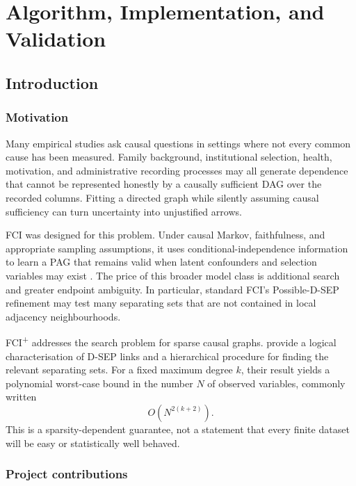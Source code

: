 \documentclass[11pt,a4paper,oneside]{report}
\newcommand{\FCIplus}{FCI\textsuperscript{+}}
\begin{document}
\clearpage
{}

\part{Algorithm, Implementation, and Validation}

\chapter{Introduction}

\section{Motivation}

Many empirical studies ask causal questions in settings where not every common
cause has been measured. Family background, institutional selection, health,
motivation, and administrative recording processes may all generate
dependence that cannot be represented honestly by a causally sufficient DAG
over the recorded columns. Fitting a directed graph while silently assuming
causal sufficiency can turn uncertainty into unjustified arrows.

FCI was designed for this problem. Under causal Markov, faithfulness, and
appropriate sampling assumptions, it uses conditional-independence
information to learn a PAG that remains valid when latent confounders and
selection variables may exist \citep{spirtes2000causation,
richardson2002ancestral}. The price of this broader model class is additional
search and greater endpoint ambiguity. In particular, standard FCI's
Possible-D-SEP refinement may test many separating sets that are not contained
in local adjacency neighbourhoods.

\FCIplus{} addresses the search problem for sparse causal graphs.
\citet{claassen2013learning} provide a logical characterisation of D-SEP links
and a hierarchical procedure for finding the relevant separating sets. For a
fixed maximum degree \(k\), their result yields a polynomial worst-case bound
in the number \(N\) of observed variables, commonly written
\[
  O\!\left(N^{2(k+2)}\right).
\]
This is a sparsity-dependent guarantee, not a statement that every finite
dataset will be easy or statistically well behaved.

\section{Project contributions}
\end{document}
